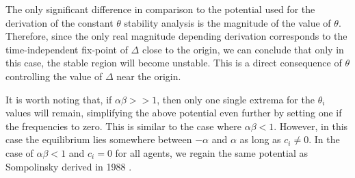 \documentclass[reprint,amsmath,amssymb,aps]{revtex4-2}
\begin{document}
The only significant difference in comparison to the potential used for the derivation of the constant $\theta$ stability analysis is the magnitude of the value of $\theta$. Therefore, since the only real magnitude depending derivation corresponds to the time-independent fix-point of $\Delta$ close to the origin, we can conclude that only in this case, the stable region will become unstable. This is a direct consequence of $\theta$ controlling the value of $\Delta$ near the origin. 

It is worth noting that, if $\alpha\beta>>1$, then only one single extrema for the $\theta_i$ values will remain, simplifying the above potential even further by setting one if the frequencies to zero. This is similar to the case where $\alpha\beta<1$. However, in this case the equilibrium lies somewhere between $-\alpha$ and $\alpha$ as long as $c_i\ne 0$. %
In the case of $\alpha\beta<1$ and $c_i=0$ for all agents, we regain the same potential as Sompolinsky derived in 1988 \cite{Sompolinsky1988}.

\end{document}
